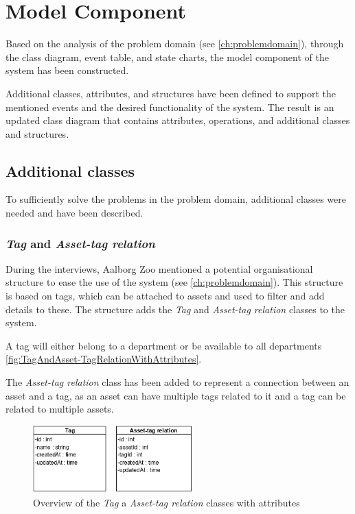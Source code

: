 \section{Model Component} \label{sc:model_component}
Based on the analysis of the problem domain (see \autoref{ch:problemdomain}), through the class diagram, event table, and state charts, the model component of the system has been constructed.
\par
Additional classes, attributes, and structures have been defined to support the mentioned events and the desired functionality of the system. The result is an updated class diagram that contains attributes, operations, and additional classes and structures.

\subsection{Additional classes}
To sufficiently solve the problems in the problem domain, additional classes were needed and have been described.
\par

\subsubsection{\textit{Tag} and \textit{Asset-tag relation}}
During the interviews, Aalborg Zoo mentioned a potential organisational structure to ease the use of the system (see \autoref{ch:problemdomain}). This structure is based on tags, which can be attached to assets and used to filter and add details to these.
The structure adds the \textit{Tag} and \textit{Asset-tag relation} classes to the system. 
\par
A tag will either belong to a department or be available to all departments \autoref{fig:TagAndAsset-TagRelationWithAttributes}.
\par
The \textit{Asset-tag relation} class has been added to represent a connection between an asset and a tag, as an asset can have multiple tags related to it and a tag can be related to multiple assets.
\par

\begin{figure}[H]
    \centering
    \includegraphics[width=0.55\textwidth]{figures/Classes/TagAndAsset-tagRelationWithAttributes.png}
    \caption{Overview of the \textit{Tag} a \textit{Asset-tag relation} classes with attributes}
    \label{fig:TagAndAsset-TagRelationWithAttributes}
\end{figure}



